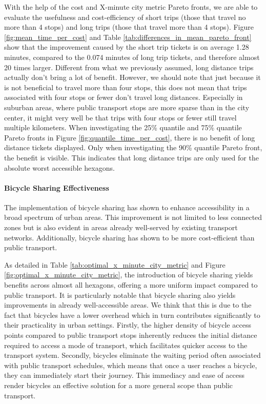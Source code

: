 With the help of the cost and X-minute city metric Pareto fronts, we are able to evaluate the usefulness and cost-efficiency of short trips (those that travel no more than 4 stops) and long trips (those that travel more than 4 stops).
Figure \ref{fig:mean_time_per_cost} and Table \ref{tab:differences_in_mean_pareto_front} show that the improvement caused by the short trip tickets is on average 1.28 minutes, compared to the 0.074 minutes of long trip tickets, and therefore almost 20 times larger.
Different from what we previously assumed, long distance trips actually don't bring a lot of benefit.
However, we should note that just because it is not beneficial to travel more than four stops, this does not mean that trips associated with four stops or fewer don't travel long distances.
Especially in suburban areas, where public transport stops are more sparse than in the city center, it might very well be that trips with four stops or fewer still travel multiple kilometers.
When investigating the 25\% quantile and 75\% quantile Pareto fronts in Figure \ref{fig:quantile_time_per_cost}, there is no benefit of long distance tickets displayed.
Only when investigating the 90\% quantile Pareto front, the benefit is visible.
This indicates that long distance trips are only used for the absolute worst accessible hexagons.

\paragraph{Bicycle Sharing Effectiveness}
The implementation of bicycle sharing has shown to enhance accessibility in a broad spectrum of urban areas. 
This improvement is not limited to less connected zones but is also evident in areas already well-served by existing transport networks.
Additionally, bicycle sharing has shown to be more cost-efficient than public transport.

As detailed in Table \ref{tab:optimal_x_minute_city_metric} and Figure \ref{fig:optimal_x_minute_city_metric}, the introduction of bicycle sharing yields benefits across almost all hexagons, offering a more uniform impact compared to public transport. 
It is particularly notable that bicycle sharing also yields improvements in already well-accessible areas. 
We think that this is due to the fact that bicycles have a lower overhead which in turn contributes significantly to their practicality in urban settings.
Firstly, the higher density of bicycle access points compared to public transport stops inherently reduces the initial distance required to access a mode of transport, which  facilitates quicker access to the transport system. 
Secondly, bicycles eliminate the waiting period often associated with public transport schedules, which means that once a user reaches a bicycle, they can immediately start their journey. 
This immediacy and ease of access render bicycles an effective solution for a more general scope than public transport.

